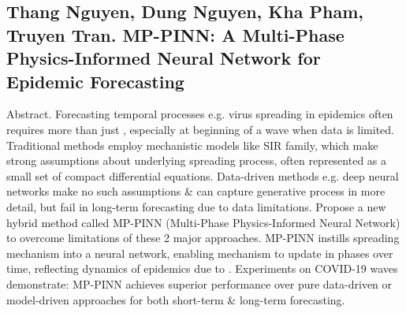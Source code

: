\documentclass{article}
\begin{document}

\subsection{{\sc Thang Nguyen, Dung Nguyen, Kha Pham, Truyen Tran}. MP-PINN: A Multi-Phase Physics-Informed Neural Network for Epidemic Forecasting}
{\sf Abstract.} Forecasting temporal processes e.g. virus spreading in epidemics often requires more than just , especially at beginning of a wave when data is limited. Traditional methods employ mechanistic models like SIR family, which make strong assumptions about underlying spreading process, often represented as a small set of compact differential equations. Data-driven methods e.g. deep neural networks make no such assumptions \& can capture generative process in more detail, but fail in long-term forecasting due to data limitations. Propose a new hybrid method called MP-PINN (Multi-Phase Physics-Informed Neural Network) to overcome limitations of these 2 major approaches. MP-PINN instills spreading mechanism into a neural network, enabling mechanism to update in phases over time, reflecting dynamics of epidemics due to . Experiments on COVID-19 waves demonstrate: MP-PINN achieves superior performance over pure data-driven or model-driven approaches for both short-term \& long-term forecasting.
\end{document}
